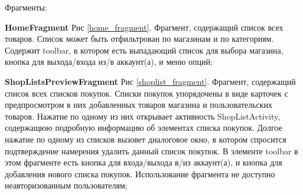 \begin{my_enumerate}
        Фрагменты:
        \begin{my_enumerate}
            \item \textbf{HomeFragment} Рис \ref{home_fragment}. Фрагмент, содержащий список всех
                товаров. Список может быть отфильтрован по магазинам и по
                категориям. Содержит toolbar, в котором есть выпадающий список
                для выбора магазина, кнопка для выхода/входа из/в аккаунт(а), и
                меню опций;
            \item \textbf{ShopListsPreviewFragment} Рис \ref{shoplist_fragment}. Фрагмент, содержащий список
                всех списков покупок. Списки покупок упорядочены в виде
                карточек с предпросмотром в них добавленных товаров магазина и
                пользовательских товаров. Нажатие по одному из них открывает
                активность ShopListActivity, содержащюю подробную информацию об
                элементах списка покупок. Долгое нажатие по одному из списков
                вызовет диалоговое окно, в котором спросится подтверждение
                намерения удалить данный список покупок. В элементе toolbar в
                этом фрагменте есть кнопка для входа/выхода в/из аккаунт(а), и
                кнопка для добавления нового списка покупок. Использование
                фрагмента не доступно неавторизованным пользователям;
        \end{my_enumerate}
        \begin{figure}[h!]
            \centering

\end{figure}
\end{my_enumerate}
